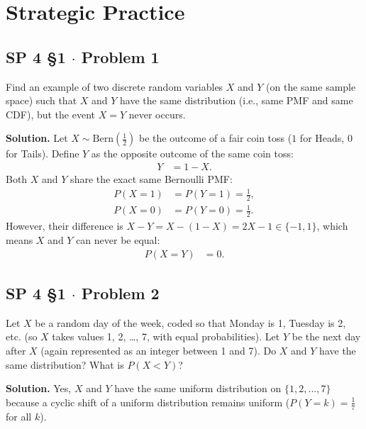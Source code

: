 \documentclass[11pt,a4paper]{article}
\begin{document}
\vspace{15pt}
\section{Strategic Practice}

\subsection{SP 4 \S1 $\cdot$ Problem 1}
\begin{tcolorbox}[title={SP 4 \S1 $\cdot$ Problem 1}]
Find an example of two discrete random variables $X$ and $Y$ (on the same sample space) such that $X$ and $Y$ have the same distribution (i.e., same PMF and same CDF), but the event $X = Y$ never occurs.
\end{tcolorbox}

\noindent \textbf{Solution.} Let $X \sim \text{Bern}\left(\frac{1}{2}\right)$ be the outcome of a fair coin toss ($1$ for Heads, $0$ for Tails). Define $Y$ as the opposite outcome of the same coin toss:
\begin{align*}
Y &= 1 - X.
\end{align*}
Both $X$ and $Y$ share the exact same Bernoulli PMF:
\begin{align*}
P(X = 1) &= P(Y = 1) = \frac{1}{2}, \\
P(X = 0) &= P(Y = 0) = \frac{1}{2}.
\end{align*}
However, their difference is $X - Y = X - (1 - X) = 2X - 1 \in \{-1, 1\}$, which means $X$ and $Y$ can never be equal:
\begin{align*}
P(X = Y) &= 0.
\end{align*}

\vspace{10pt}
\subsection{SP 4 \S1 $\cdot$ Problem 2}
\begin{tcolorbox}[title={SP 4 \S1 $\cdot$ Problem 2}]
Let $X$ be a random day of the week, coded so that Monday is 1, Tuesday is 2, etc. (so $X$ takes values 1, 2, \dots, 7, with equal probabilities). Let $Y$ be the next day after $X$ (again represented as an integer between 1 and 7). Do $X$ and $Y$ have the same distribution? What is $P(X < Y)$?
\end{tcolorbox}

\noindent \textbf{Solution.} Yes, $X$ and $Y$ have the same uniform distribution on $\{1, 2, \dots, 7\}$ because a cyclic shift of a uniform distribution remains uniform ($P(Y = k) = \frac{1}{7}$ for all $k$).
\end{document}
